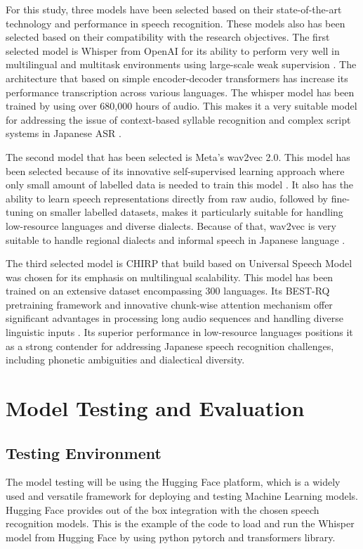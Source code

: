     
For this study, three models have been selected based on their state-of-the-art technology and performance in speech recognition. These models also has been selected based on their compatibility with the research objectives. The first selected model is Whisper from OpenAI for its ability to perform very well in multilingual and multitask environments using large-scale weak supervision \parencite{radford2023robust}. The architecture that based on simple encoder-decoder transformers has increase its performance transcription across various languages. The whisper model has been trained by using over 680,000 hours of audio. This makes it a very suitable model for addressing the issue of context-based syllable recognition and complex script systems in Japanese ASR \parencite{bajo2024efficient}. 
 
The second model that has been selected is Meta’s wav2vec 2.0. This model has been selected because of its innovative self-supervised learning approach where only small amount of labelled data is needed to train this model \parencite{baevski2020wav2vec}. It also has the ability to learn speech representations directly from raw audio, followed by fine-tuning on smaller labelled datasets, makes it particularly suitable for handling low-resource languages and diverse dialects. Because of that, wav2vec is very suitable to handle  regional dialects and informal speech  in Japanese language \parencite{miwa2023dialect}. 

The third selected model is CHIRP that build based on Universal Speech Model was chosen for its emphasis on multilingual scalability. This model has been trained on an extensive dataset encompassing 300 languages. Its BEST-RQ pretraining framework and innovative chunk-wise attention mechanism offer significant advantages in processing long audio sequences and handling diverse linguistic inputs \parencite{zhang2023google}. Its superior performance in low-resource languages positions it as a strong contender for addressing Japanese speech recognition challenges, including phonetic ambiguities and dialectical diversity.


\section{Model Testing and Evaluation}
\subsection{Testing Environment}
The model testing will be using the Hugging Face platform, which is a widely used and versatile framework for deploying and testing Machine Learning models. Hugging Face provides out of the box integration with the chosen speech recognition models. This is the example of the code to load and run the Whisper model from Hugging Face by using python pytorch and transformers library.


